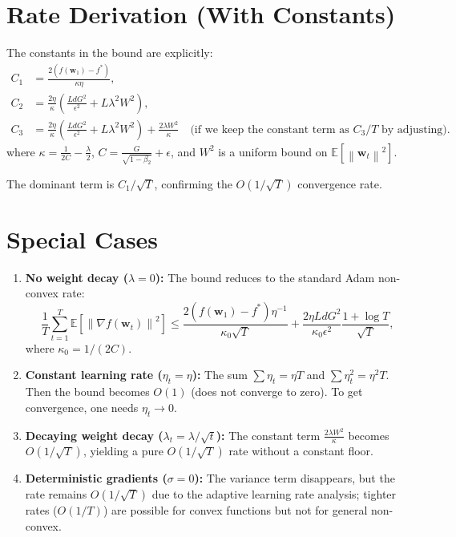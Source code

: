 \documentclass{article}
\theoremstyle{plain}
\theoremstyle{definition}
\renewcommand{\vec}[1]{\boldsymbol{#1}}
\newcommand{\norm}[1]{\left\| #1 \right\|}
\newcommand{\expect}[1]{\mathbb{E}\left[ #1 \right]}
\begin{document}
\section*{Rate Derivation (With Constants)}

The constants in the bound are explicitly:
\begin{align*}
    C_1 &= \frac{2 (f(\vec{w}_1) - f^*)}{\kappa \eta}, \\
    C_2 &= \frac{2 \eta}{\kappa} \left( \frac{L d G^2}{\epsilon^2} + L \lambda^2 W^2 \right), \\
    C_3 &= \frac{2 \eta}{\kappa} \left( \frac{L d G^2}{\epsilon^2} + L \lambda^2 W^2 \right) + \frac{2 \lambda W^2}{\kappa} \quad \text{(if we keep the constant term as $C_3/T$ by adjusting)}.
\end{align*}
where $\kappa = \frac{1}{2C} - \frac{\lambda}{2}$, $C = \frac{G}{\sqrt{1-\beta_2}} + \epsilon$, and $W^2$ is a uniform bound on $\expect{\norm{\vec{w}_t}^2}$.

The dominant term is $C_1 / \sqrt{T}$, confirming the $O(1/\sqrt{T})$ convergence rate.

\section*{Special Cases}

\begin{enumerate}
    \item \textbf{No weight decay ($\lambda = 0$):} The bound reduces to the standard Adam non-convex rate:
    \begin{equation}
        \frac{1}{T} \sum_{t=1}^T \expect{\norm{\nabla f(\vec{w}_t)}^2} \le \frac{2 (f(\vec{w}_1) - f^*) \eta^{-1}}{\kappa_0 \sqrt{T}} + \frac{2 \eta L d G^2}{\kappa_0 \epsilon^2} \frac{1 + \log T}{\sqrt{T}},
    \end{equation}
    where $\kappa_0 = 1/(2C)$.

    \item \textbf{Constant learning rate ($\eta_t = \eta$):} The sum $\sum \eta_t = \eta T$ and $\sum \eta_t^2 = \eta^2 T$. Then the bound becomes $O(1)$ (does not converge to zero). To get convergence, one needs $\eta_t \to 0$.

    \item \textbf{Decaying weight decay ($\lambda_t = \lambda / \sqrt{t}$):} The constant term $\frac{2 \lambda W^2}{\kappa}$ becomes $O(1/\sqrt{T})$, yielding a pure $O(1/\sqrt{T})$ rate without a constant floor.

    \item \textbf{Deterministic gradients ($\sigma = 0$):} The variance term disappears, but the rate remains $O(1/\sqrt{T})$ due to the adaptive learning rate analysis; tighter rates ($O(1/T)$) are possible for convex functions but not for general non-convex.
\end{enumerate}
\end{document}
